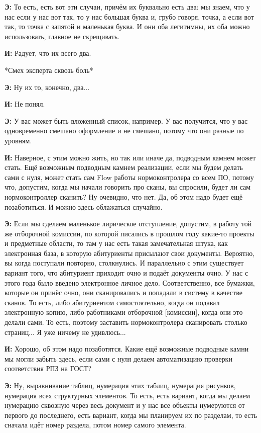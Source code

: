 \textbf{Э: }То есть, есть вот эти случаи, причём их буквально есть два: мы знаем, что у нас если у нас вот так, то у нас большая буква и, грубо говоря, точка, а если вот так, то точка с запятой и маленькая буква. И они оба легитимны, их оба можно использовать, главное не скрещивать.

\textbf{И: }Радует, что их всего два.

*Смех эксперта сквозь боль*

\textbf{Э: }Ну их то, конечно, два...

\textbf{И: }Не понял. 

\textbf{Э: }У вас может быть вложенный список, например. У вас получится, что у вас одновременно смешано оформление и не смешано, потому что они разные по уровням.

\textbf{И: }Наверное, с этим можно жить, но так или иначе да, подводным камнем может стать. Ещё возможным подводным камнем реализации, если мы будем делать сами с нуля, может стать сам Flow работы нормоконтролера со всем ПО, потому что, допустим, когда мы начали говорить про сканы, вы спросили, будет ли сам нормоконтроллер сканить? Ну очевидно, что нет. Да, об этом надо будет ещё позаботиться. И можно здесь облажаться случайно.

\textbf{Э: }Если мы сделаем маленькое лирическое отступление, допустим, в работу той же отборочной комиссии, по которой писались в прошлом году какие-то проекты и предметные области, то там у нас есть такая замечательная штука, как электронная база, в которую абитуриенты присылают свои документы. Вероятно, вы когда поступали повторно, столкнулись. И параллельно с этим существует вариант того, что абитуриент приходит очно и подаёт документы очно. У нас с этого года было введено электронное личное дело. Соответственно, все бумажки, которые он принёс очно, они сканировались и попадали в систему в качестве сканов. То есть, либо абитуриентом самостоятельно, когда он подавал электронную копию, либо работниками отборочной [комиссии], когда они это делали сами. То есть, поэтому заставить нормоконтролера сканировать столько страниц... Я уже ничему не удивлюсь...

\textbf{И: }Хорошо, об этом надо позаботятся. Какие ещё возможные подводные камни мы могли забыть здесь, если сами с нуля делаем автоматизацию проверки соответствия РПЗ на ГОСТ?

\textbf{Э: }Ну, выравнивание таблиц, нумерация этих таблиц, нумерация рисунков, нумерация всех структурных элементов. То есть, есть вариант, когда мы делаем нумерацию сквозную через весь документ и у нас все объекты нумеруются от первого до последнего, есть вариант, когда мы планируем их по разделам, то есть сначала идёт номер раздела, потом номер самого элемента.

